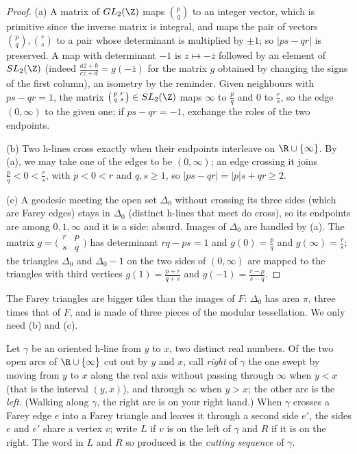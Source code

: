 \begin{proof}
(a) A matrix of $GL_2(\Z)$ maps $\binom pq$ to an integer vector, which is primitive since the inverse matrix is integral, and maps the pair of vectors $\binom pq,\binom rs$ to a pair whose determinant
is multiplied by $\pm1$; so $|ps-qr|$ is preserved. A map with determinant $-1$ is $z\mapsto-\bar z$ followed by an element of $SL_2(\Z)$ (indeed $\frac{a\bar z+b}{c\bar z+d}=g(-\bar z)$ for the matrix
$g$ obtained by changing the signs of the first column), an isometry by the reminder. Given neighbours with $ps-qr=1$, the matrix $\bigl(\begin{smallmatrix}p&r\\q&s\end{smallmatrix}\bigr)\in SL_2(\Z)$
maps $\infty$ to $\frac pq$ and $0$ to $\frac rs$, so the edge $(0,\infty)$ to the given one; if $ps-qr=-1$, exchange the roles of the two endpoints.

(b) Two h-lines cross exactly when their endpoints interleave on $\R\cup\{\infty\}$. By (a), we may take one of the edges to be $(0,\infty)$; an edge crossing it joins $\frac pq<0<\frac rs$, with $p<0<r$
and $q,s\ge1$, so $|ps-qr|=|p|s+qr\ge2$.

(c) A geodesic meeting the open set $\Delta_0$ without crossing its three sides (which are Farey edges) stays in $\Delta_0$ (distinct h-lines that meet do cross), so its endpoints are among $0,1,\infty$ and
it is a side: absurd. Images of $\Delta_0$ are handled by (a). The matrix
$g=\bigl(\begin{smallmatrix}r&p\\s&q\end{smallmatrix}\bigr)$ has determinant $rq-ps=1$ and $g(0)=\frac pq$ and $g(\infty)=\frac rs$; the triangles $\Delta_0$ and $\Delta_0-1$ on the two sides of $(0,\infty)$ are mapped to the
triangles with third vertices $g(1)=\frac{p+r}{q+s}$ and $g(-1)=\frac{r-p}{s-q}$.
\end{proof}

The Farey triangles are bigger tiles than the images of $F$: $\Delta_0$ has area $\pi$, three times that of $F$, and is made of three pieces of the modular tessellation. We only need (b) and (c).

Let $\gamma$ be an oriented h-line from $y$ to $x$, two distinct real numbers. Of the two open arcs of $\R\cup\{\infty\}$ cut out by $y$ and $x$, call \emph{right} of $\gamma$ the one swept by moving from $y$ to $x$
along the real axis without passing through $\infty$ when $y<x$ (that is the interval $(y,x)$), and through $\infty$ when $y>x$; the other arc is the \emph{left}. (Walking along $\gamma$, the right arc is on
your right hand.) When $\gamma$ crosses a Farey edge $e$ into a Farey triangle and leaves it through a second side $e'$, the sides $e$ and $e'$ share a vertex $v$; write $L$ if $v$ is on the left of
$\gamma$ and $R$ if it is on the right. The word in $L$ and $R$ so produced is the \emph{cutting sequence} of $\gamma$.

